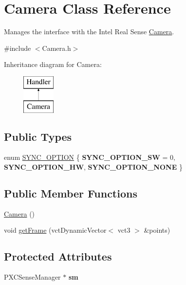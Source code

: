 \hypertarget{class_camera}{}\section{Camera Class Reference}
\label{class_camera}


Manages the interface with the Intel Real Sense \hyperlink{class_camera}{Camera}.  




{\ttfamily \#include $<$Camera.\+h$>$}

Inheritance diagram for Camera\+:\begin{figure}[H]
\begin{center}
\leavevmode
\includegraphics[height=2.000000cm]{class_camera}
\end{center}
\end{figure}
\subsection*{Public Types}
\begin{DoxyCompactItemize}
\item 
enum \hyperlink{class_camera_a83ca54501c968dae469459fb0ad78c54}{S\+Y\+N\+C\+\_\+\+O\+P\+T\+I\+ON} \{ {\bfseries S\+Y\+N\+C\+\_\+\+O\+P\+T\+I\+O\+N\+\_\+\+SW} = 0, 
{\bfseries S\+Y\+N\+C\+\_\+\+O\+P\+T\+I\+O\+N\+\_\+\+HW}, 
{\bfseries S\+Y\+N\+C\+\_\+\+O\+P\+T\+I\+O\+N\+\_\+\+N\+O\+NE}
 \}
\end{DoxyCompactItemize}
\subsection*{Public Member Functions}
\begin{DoxyCompactItemize}
\item 
\hyperlink{class_camera_a01f94c3543f56ede7af49dc778f19331}{Camera} ()
\item 
void \hyperlink{class_camera_aec22c94e7bcc461154085ef31c5de125}{get\+Frame} (vct\+Dynamic\+Vector$<$ vct3 $>$ \&points)
\end{DoxyCompactItemize}
\subsection*{Protected Attributes}
\begin{DoxyCompactItemize}
\item 
P\+X\+C\+Sense\+Manager $\ast$ {\bfseries sm}\hypertarget{class_camera_aac4ebf35b8a29c3c233a12f1e6294292}{}\label{class_camera_aac4ebf35b8a29c3c233a12f1e6294292}

\end{DoxyCompactItemize}


